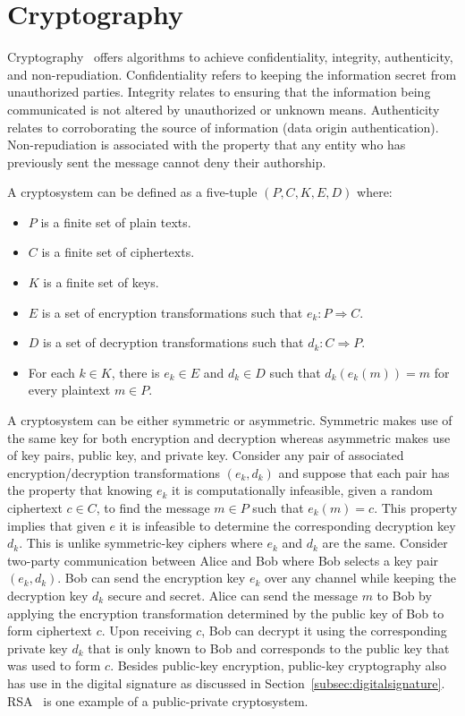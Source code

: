 \section{Cryptography} \label{sec:cryptography}
Cryptography~\cite{katz1996handbook} offers algorithms to achieve
confidentiality, integrity, authenticity, and non-repudiation. Confidentiality
refers to keeping the information secret from unauthorized parties. Integrity
relates to ensuring that the information being communicated is not altered by
unauthorized or unknown means. Authenticity relates to corroborating the source
of information (data origin authentication). Non-repudiation is associated with
the property that any entity who has previously sent the message cannot deny
their authorship.  \par
A cryptosystem can be defined as a five-tuple $(P, C, K, E, D)$ where: 
\begin{itemize}
	\item $P$ is a finite set of plain texts.
	\item $C$ is a finite set of ciphertexts.
	\item $K$ is a finite set of keys.
	\item $E$ is a set of encryption transformations such that $e_{k}:P \Rightarrow C$.
	\item $D$ is a set of decryption transformations such that $d_{k}:C \Rightarrow P$. 
	\item For each $k \in K$, there is $e_k \in E$ and $d_k \in D$ such that
		$d_k(e_k(m)) = m$ for every plaintext $m \in P$.
\end{itemize}
A cryptosystem can be either symmetric or asymmetric. Symmetric makes use of
the same key for both encryption and decryption whereas asymmetric makes use of
key pairs, public key, and private key. Consider any pair of associated
encryption/decryption transformations $(e_{k},d_{k})$ and suppose that each
pair has the property that knowing  $e_{k}$ it is computationally infeasible,
given a random ciphertext $c \in C$, to find the message $m \in P$ such that
$e_{k}(m) = c$. This property implies that given $e$ it is infeasible to
determine the corresponding decryption key $d_{k}$. This is unlike
symmetric-key ciphers where $e_{k}$ and $d_{k}$ are the same.  Consider
two-party communication between Alice and Bob where Bob selects a key pair
$(e_{k}, d_{k})$. Bob can send the encryption key $e_{k}$ over any channel
while keeping the decryption key $d_{k}$ secure and secret. Alice can send the
message $m$ to Bob by applying the encryption transformation determined by the
public key of Bob to form ciphertext $c$. Upon receiving $c$, Bob can decrypt
it using the corresponding private key $d_{k}$ that is only known to Bob and
corresponds to the public key that was used to form $c$. Besides public-key
encryption, public-key cryptography also has use in the digital signature as
discussed in Section~\ref{subsec:digitalsignature}. RSA~\cite{rivest1978method}
is one example of a public-private cryptosystem. 
